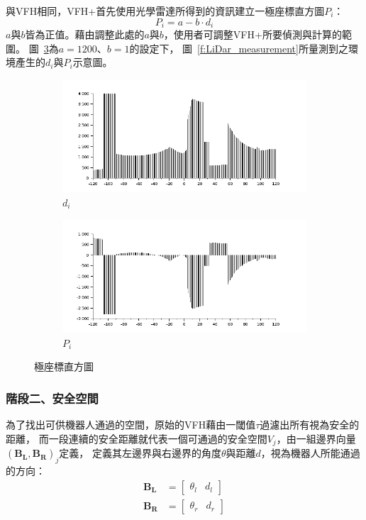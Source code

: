與VFH相同，VFH+首先使用光學雷達所得到的資訊建立一極座標直方圖$P_i$：
\begin{equation}
	P_i = a - b\cdot d_i
\end{equation}
$a$與$b$皆為正值。藉由調整此處的$a$與$b$，使用者可調整VFH+所要偵測與計算的範圍。
圖~\ref{f:polar_histogram}為$a=1200$、$b=1$的設定下，
圖~\ref{f:LiDar_measurement}所量測到之環境產生的$d_i$與$P_i$示意圖。
\begin{figure}[h!]
	\centering
	\begin{subfigure}[b]{0.7\textwidth}
		\includegraphics[width=\textwidth]{figures/algorithm/polar_histogram}
		\caption{$d_i$}
		\label{f:polar_histogram_original}
	\end{subfigure}
	\begin{subfigure}[b]{0.7\textwidth}
		\includegraphics[width=\textwidth]{figures/algorithm/polar_histogram_modified}
		\caption{$P_i$}
		\label{f:polar_histogram_modified}
	\end{subfigure}
	\caption{極座標直方圖}
	\label{f:polar_histogram}
\end{figure}

\subsubsection{階段二、安全空間}
\label{subsubsec:free_spaces}
為了找出可供機器人通過的空間，原始的VFH藉由一閾值$\tau$過濾出所有視為安全的距離，
而一段連續的安全距離就代表一個可通過的安全空間$V_j$，由一組邊界向量$(\mathbf{B_L},\mathbf{B_R})_j$定義，
定義其左邊界與右邊界的角度$\theta$與距離$d$，視為機器人所能通過的方向：
\begin{align}
	\mathbf{B_L}	&= \begin{bmatrix}
				\theta_l & d_l
			   \end{bmatrix} \nonumber \\
	\mathbf{B_R}	&= \begin{bmatrix}
				\theta_r & d_r
			   \end{bmatrix}
	\label{e:boundary}
\end{align}

